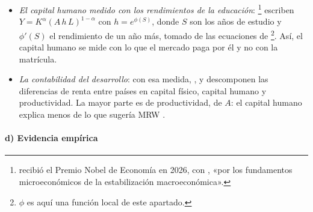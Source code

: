 \documentclass[11pt]{article}
\begin{document}
\begin{itemize}
\item \emph{El capital humano medido con los rendimientos de la educación}: \textcite{HallJones1999Why}\footnote{ recibió el Premio Nobel de Economía en 2026, con , «por los fundamentos microeconómicos de la estabilización macroeconómica»\nocite{Nobel2026Prensa}.} escriben $Y=K^{\alpha}(A\,h\,L)^{1-\alpha}$ con $h=e^{\phi(S)}$, donde $S$ son los años de estudio y $\phi'(S)$ el rendimiento de un año más, tomado de las ecuaciones de   \footnote{$\phi$ es aquí una función local de este apartado.}. Así, el capital humano se mide con lo que el mercado paga por él y no con la matrícula.
\item \emph{La contabilidad del desarrollo}: con esa medida, \textcite{KlenowRodriguezClare1997Neoclassical}, \textcite{HallJones1999Why} y \textcite{Caselli2005Accounting} descomponen las diferencias de renta entre países en capital físico, capital humano y productividad. La mayor parte es de productividad, de $A$: el capital humano explica menos de lo que sugería MRW .
\end{itemize}

\paragraph{d) Evidencia empírica}
\end{document}
